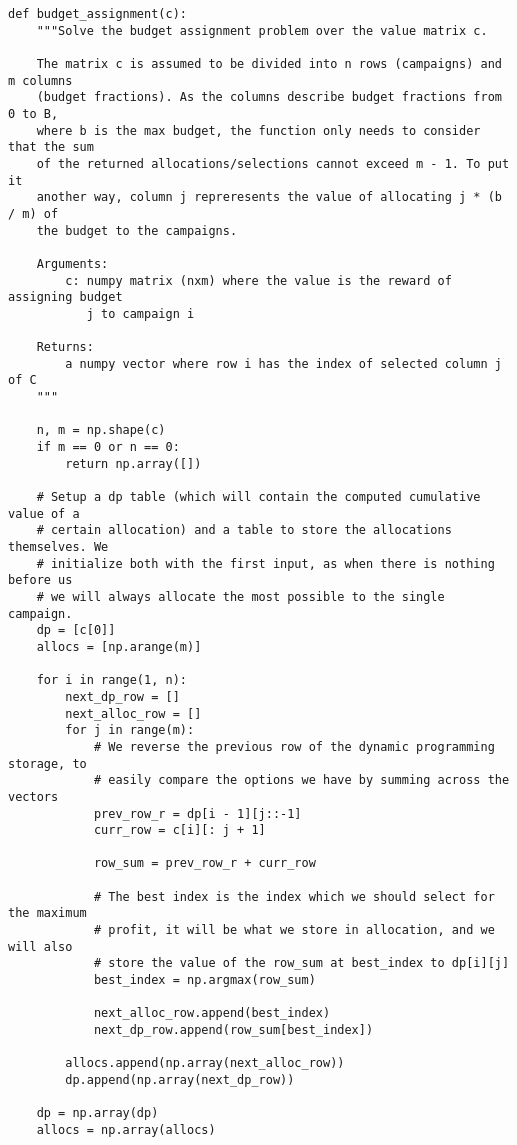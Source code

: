 \begin{lstlisting}[style=Python]
def budget_assignment(c):
    """Solve the budget assignment problem over the value matrix c.

    The matrix c is assumed to be divided into n rows (campaigns) and m columns
    (budget fractions). As the columns describe budget fractions from 0 to B,
    where b is the max budget, the function only needs to consider that the sum
    of the returned allocations/selections cannot exceed m - 1. To put it
    another way, column j repreresents the value of allocating j * (b / m) of
    the budget to the campaigns.

    Arguments:
        c: numpy matrix (nxm) where the value is the reward of assigning budget
           j to campaign i

    Returns:
        a numpy vector where row i has the index of selected column j of C
    """

    n, m = np.shape(c)
    if m == 0 or n == 0:
        return np.array([])

    # Setup a dp table (which will contain the computed cumulative value of a
    # certain allocation) and a table to store the allocations themselves. We
    # initialize both with the first input, as when there is nothing before us
    # we will always allocate the most possible to the single campaign.
    dp = [c[0]]
    allocs = [np.arange(m)]

    for i in range(1, n):
        next_dp_row = []
        next_alloc_row = []
        for j in range(m):
            # We reverse the previous row of the dynamic programming storage, to
            # easily compare the options we have by summing across the vectors
            prev_row_r = dp[i - 1][j::-1]
            curr_row = c[i][: j + 1]

            row_sum = prev_row_r + curr_row

            # The best index is the index which we should select for the maximum
            # profit, it will be what we store in allocation, and we will also
            # store the value of the row_sum at best_index to dp[i][j]
            best_index = np.argmax(row_sum)

            next_alloc_row.append(best_index)
            next_dp_row.append(row_sum[best_index])

        allocs.append(np.array(next_alloc_row))
        dp.append(np.array(next_dp_row))

    dp = np.array(dp)
    allocs = np.array(allocs)


\end{lstlisting}
